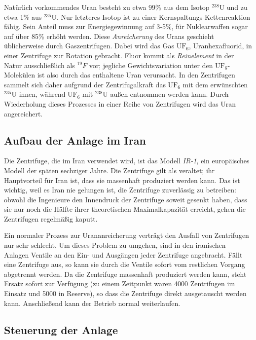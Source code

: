 \documentclass[a4paper]{article}
\begin{document}
Natürlich vorkommendes Uran besteht zu etwa 99\% aus dem Isotop $^{238}\mathrm U$ und zu etwa 1\% aus $^{235}\mathrm U$.
Nur letzteres Isotop ist zu einer Kernspaltungs-Kettenreaktion fähig.
Sein Anteil muss zur Energiegewinnung auf 3-5\%, für Nuklearwaffen sogar auf über 85\% erhöht werden.
Diese \emph{Anreicherung} des Urans geschieht üblicherweise durch Gaszentrifugen.
Dabei wird das Gas $\mathrm{UF}_6$, Uranhexafluorid, in einer Zentrifuge zur Rotation gebracht.
Fluor kommt als \emph{Reinelement} in der Natur ausschließlich als $^{19}F$ vor;
jegliche Gewichtsvariation unter den $\mathrm{UF}_6$-Molekülen ist also durch das enthaltene Uran verursacht.
In den Zentrifugen sammelt sich daher aufgrund der Zentrifugalkraft das $\mathrm{UF}_6$ mit dem erwünschten $^{235}\mathrm U$ innen,
während $\mathrm{UF}_6$ mit $^{238}\mathrm U$ außen entnommen werden kann.
Durch Wiederholung dieses Prozesses in einer Reihe von Zentrifugen wird das Uran angereichert.\cite{wiki:urananreicherung}

\subsection{Aufbau der Anlage im Iran}

Die Zentrifuge, die im Iran verwendet wird, ist das Modell \emph{IR-1}, ein europäisches Modell der späten sechziger Jahre.
Die Zentrifuge gilt als veraltet; ihr Hauptvorteil für Iran ist, dass sie massenhaft produziert werden kann.
Das ist wichtig, weil es Iran nie gelungen ist, die Zentrifuge zuverlässig zu betreiben:
obwohl die Ingenieure den Innendruck der Zentrifuge soweit gesenkt haben, dass sie nur noch die Hälfte ihrer theoretischen Maximalkapazität erreicht,
gehen die Zentrifugen regelmäßig kaputt.

Ein normaler Prozess zur Urananreicherung verträgt den Ausfall von Zentrifugen nur sehr schlecht.
Um dieses Problem zu umgehen, sind in den iranischen Anlagen Ventile an den Ein- und Ausgängen jeder Zentrifuge angebracht.
Fällt eine Zentrifuge aus, so kann sie durch die Ventile sofort vom restlichen Vorgang abgetrennt werden.
Da die Zentrifuge massenhaft produziert werden kann, steht Ersatz sofort zur Verfügung
(zu einem Zeitpunkt waren 4000 Zentrifugen im Einsatz und 5000 in Reserve\cite{tkac}), %
so dass die Zentrifuge direkt ausgetauscht werden kann.
Anschließend kann der Betrieb normal weiterlaufen.

\subsection{Steuerung der Anlage}
\end{document}

